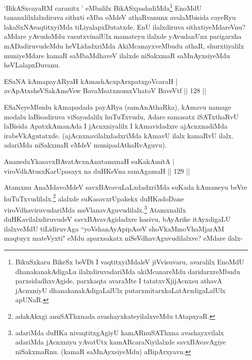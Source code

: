 \begin{artha}
`BikASxcayaRM caranitx ' eMbalilx BikASxpadadiMda\footnote{BikuSxkaru BikeSx beVDi I vaqtitxyiMdaleV jiVvisuvaru, avaralilx EnoMdU dhanakanakAdigaLu ilalxdiruvadariMda  akiMcanareMdu daridarxreMbudu parxsidadhxvAgide, parxkaqta avaraMte I tatatxvXjijAcnxsu athavA jAcnxniyU dhanakanakAdigaLalUlx putarxmitarxkaLatArxdigaLalUlx apUNaR.} EnoMdU tananxlilxlalxdiruva sithxti eMba oMdeV athaRvanunx avalaMbisida cayeRyu lakaSxNAvaqtitxyiMda tiLiyalapxDutatxde. EnU ilalxdiruva sithxtiyeMdareVnu? aMdare yAvudoMdu vasutxvinalUlx mamateyu ilalxde yAvudanUnx parigarxha mADadiruvudeMdu heVLidadxriMda AkiMcanayxveMbudu athaR, shurxtiyalilx muniyeMdare kamaR saMbaMdhaveV ilalxde niSakxmaR saMnAyxsiyeMdu heVLalapxDuvanu.
\end{artha}%


\begin{shl}
ESaNA kAmapayARyaH kAmashAcxpArxpatxgoVcaraH |\\
avApAtxsheVSakAmeV\s sw BavaMsatxnomxVhatoV BaveVtf \hfill || 128 ||
\end{shl}

\begin{artha}
ESaNeyeMbudu kAmapadada payARya (samAnAthaRka), kAmavu namage modalu laBisadiruva viSayadalilx huTuTxvudu, Adare samasatx iSATxthaRvU laBisida ApatxkAmanAda I jAcnxniyalilx I kAmavidadxre ajAcnxnadiMda irabeVkAgutatxde. (ajAcnxnavilalxdadxriMda kAmavU ilalx kamaRvU ilalx. adariMda  niSakxmaR eMdeV munipadAthaRvAguvu).
\end{artha}


\begin{shl}
AnanedxYkasavxBAvatAvxnAnx\s \s tamxnaH suKakAmitA |\\
viroVdhAtusxKarUpasayx na duHKeVna samAgamaH \hfill || 129 ||
\end{shl}

\begin{artha}
Atamxnu AnaMdavoMdeV savxBAvavuLaLxdadxriMda suKada kAmaneyu beVre huTuTxvudilalx.\footnote{adakAkxgi anuSAThxnada avashayxkateyilalxveMdu tAtapxyaR.} alalxde suKasavxrUpakekx duHKadoDane viroVdhaviruvudariMda meVlanavAguvudilalx.\footnote{adariMda duHKa nivaqtitxgAgiyU kamARnuSAThxna avashayxvilalx adariMda jAcnxniyu yAvatUtx kamARcaraNiyilalxde savxBAvavAgiye niSakxmaRnu. (kamaR saMnAyxsiyeMdu) aBipArxyavu.} Atamxnalilx duHKavilalxdiruvudeV savxBAvavAgidadxre hasivu, bAyArike itAyxdigaLU ilalxveMdU tiLidiruvAga ``yoV\s shanAyApipAseV shoVkaMmoVhaMjarAM maqtuyx mateVyxti" eMdu aparxsakatx niSeVdhavAguvudilalxve? eMdare ilalx-
\end{artha}%

